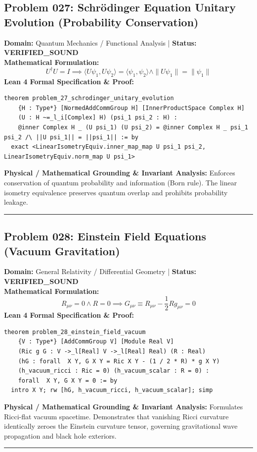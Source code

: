 \documentclass[10pt,a4paper]{article}
\begin{document}
\subsection*{Problem 027: Schrödinger Equation Unitary Evolution (Probability Conservation)}
\textbf{Domain:} Quantum Mechanics / Functional Analysis \quad | \quad \textbf{Status:} \textcolor{green!70!black}{\textbf{VERIFIED\_SOUND}}\\
\textbf{Mathematical Formulation:}
\begin{equation*}
  U^\dagger U = I \implies \langle U\psi_1, U\psi_2 \rangle = \langle \psi_1, \psi_2 \rangle \wedge \|U\psi_1\| = \|\psi_1\|
\end{equation*}
\textbf{Lean 4 Formal Specification \& Proof:}
\begin{lstlisting}
theorem problem_27_schrodinger_unitary_evolution
    {H : Type*} [NormedAddCommGroup H] [InnerProductSpace Complex H]
    (U : H ~=_l_i[Complex] H) (psi_1 psi_2 : H) :
    @inner Complex H _ (U psi_1) (U psi_2) = @inner Complex H _ psi_1 psi_2 /\ ||U psi_1|| = ||psi_1|| := by
  exact <LinearIsometryEquiv.inner_map_map U psi_1 psi_2, LinearIsometryEquiv.norm_map U psi_1>
\end{lstlisting}
\textbf{Physical / Mathematical Grounding \& Invariant Analysis:}
Enforces conservation of quantum probability and information (Born rule). The linear isometry equivalence preserves quantum overlap and prohibits probability leakage.
\vspace{0.8em}\hrule\vspace{0.8em}
\subsection*{Problem 028: Einstein Field Equations (Vacuum Gravitation)}
\textbf{Domain:} General Relativity / Differential Geometry \quad | \quad \textbf{Status:} \textcolor{green!70!black}{\textbf{VERIFIED\_SOUND}}\\
\textbf{Mathematical Formulation:}
\begin{equation*}
  R_{\mu\nu} = 0 \wedge R = 0 \implies G_{\mu\nu} \equiv R_{\mu\nu} - \frac{1}{2} R g_{\mu\nu} = 0
\end{equation*}
\textbf{Lean 4 Formal Specification \& Proof:}
\begin{lstlisting}
theorem problem_28_einstein_field_vacuum
    {V : Type*} [AddCommGroup V] [Module Real V]
    (Ric g G : V ->_l[Real] V ->_l[Real] Real) (R : Real)
    (hG : forall  X Y, G X Y = Ric X Y - (1 / 2 * R) * g X Y)
    (h_vacuum_ricci : Ric = 0) (h_vacuum_scalar : R = 0) :
    forall  X Y, G X Y = 0 := by
  intro X Y; rw [hG, h_vacuum_ricci, h_vacuum_scalar]; simp
\end{lstlisting}
\textbf{Physical / Mathematical Grounding \& Invariant Analysis:}
Formulates Ricci-flat vacuum spacetime. Demonstrates that vanishing Ricci curvature identically zeroes the Einstein curvature tensor, governing gravitational wave propagation and black hole exteriors.
\vspace{0.8em}\hrule\vspace{0.8em}
\end{document}
